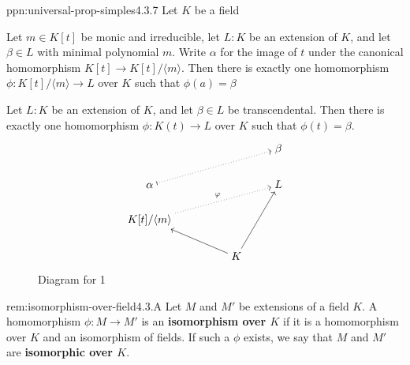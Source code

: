 \documentclass[landscape, 8pt]{extarticle}
\begin{document}
\begin{multicols}{3}
\begin{ppn}{ppn:universal-prop-simples}{4.3.7}
    Let $K$ be a field
    \begin{enumerate-tight}
        \item Let $m\in K[t]$ be monic and irreducible, let $L : K$ be an extension of $K$, and let $\beta\in L$ with minimal polynomial $m$. Write $\alpha$ for the image of $t$ under the canonical homomorphism $K[t] \to K[t] / \langle m \rangle$. Then there is exactly one homomorphism $\phi : K[t] / \langle m \rangle \to L$ over $K$ such that $\phi(a) = \beta$
        \item Let $L : K$ be an extension of $K$, and let $\beta\in L$ be transcendental. Then there is exactly one homomorphism $\phi : K(t) \to L$ over $K$ such that $\phi(t) = \beta$.
    \end{enumerate-tight}
    \begin{figure}[H]
        \centering
\[\begin{tikzcd}[cramped]
	&&& \beta \\
	\alpha &&& L \\
	{K[t]/\langle m \rangle} \\
	&& K
	\arrow[dotted, maps to, from=2-1, to=1-4]
	\arrow["\phi", dotted, from=3-1, to=2-4]
	\arrow[from=4-3, to=2-4]
	\arrow[from=4-3, to=3-1]
\end{tikzcd}\]
        \caption{Diagram for 1}
        \label{fig:simple-extension-uniprop}
    \end{figure}
\end{ppn}


\begin{rem}{rem:isomorphism-over-field}{4.3.A}
    Let $M$ and $M'$ be extensions of a field $K$. A homomorphism $\phi : M \to M'$ is an \textbf{isomorphism over $K$} if it is a homomorphism over $K$ and an isomorphism of fields. If such a $\phi$ exists, we say that $M$ and $M'$ are \textbf{isomorphic over $K$}.
\end{rem}


\end{multicols}
\end{document}
